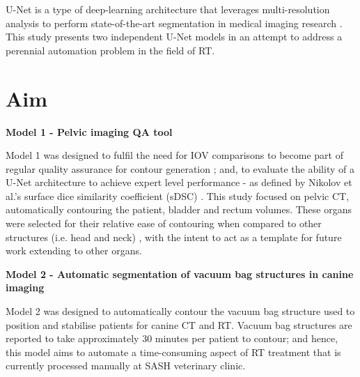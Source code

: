 U-Net is a type of deep-learning architecture that leverages multi-resolution
analysis to perform state-of-the-art segmentation in medical imaging research
\cite{Kazemifar_2018, Zhu_2018}. This study presents two independent U-Net
models in an attempt to address a perennial automation problem in the field of
RT.

\section{Aim}


\textbf{Model 1 - Pelvic imaging QA tool}

Model 1 was designed to fulfil the need for IOV comparisons to become part of
regular quality assurance for contour generation \cite{Vinod_2016}; and, to
evaluate the ability of a U-Net architecture to achieve expert level performance
- as defined by Nikolov et al.'s surface dice similarity coefficient (sDSC)
\cite{Nikolov_2018}. This study focused on pelvic CT, automatically
contouring the patient, bladder and rectum volumes. These organs were selected
for their relative ease of contouring when compared to other structures (i.e. head
and neck) \cite{Wong2020}, with the intent to act as a template for future work
extending to other organs.

\textbf{Model 2 - Automatic segmentation of vacuum bag structures in canine
imaging}

Model 2 was designed to automatically contour the vacuum bag structure used to
position and stabilise patients for canine CT and RT. Vacuum bag structures are
reported to take approximately 30 minutes per patient to contour; and hence,
this model aims to automate a time-consuming aspect of RT treatment that is
currently processed manually at SASH veterinary clinic.


